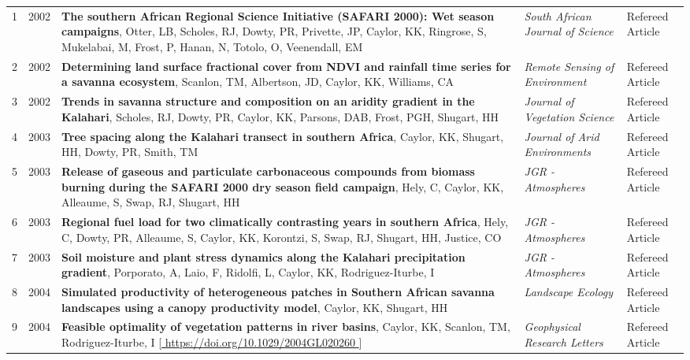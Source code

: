 
\begin{supertabular}{lcp{8.25cm}p{4.75cm}p{1.75cm}}
1 & 2002 & {\bf The southern African Regional Science Initiative (SAFARI 2000): Wet season campaigns}, Otter, LB, Scholes, RJ, Dowty, PR, Privette, JP, Caylor, KK, Ringrose, S, Mukelabai, M, Frost, P, Hanan, N, Totolo, O, Veenendall, EM  & \emph{ South African Journal of Science } & Refereed Article\\
2 & 2002 & {\bf Determining land surface fractional cover from NDVI and rainfall time series for a savanna ecosystem}, Scanlon, TM, Albertson, JD, Caylor, KK, Williams, CA  & \emph{ Remote Sensing of Environment } & Refereed Article\\
3 & 2002 & {\bf Trends in savanna structure and composition on an aridity gradient in the Kalahari}, Scholes, RJ, Dowty, PR, Caylor, KK, Parsons, DAB, Frost, PGH, Shugart, HH  & \emph{ Journal of Vegetation Science } & Refereed Article\\
4 & 2003 & {\bf Tree spacing along the Kalahari transect in southern Africa}, Caylor, KK, Shugart, HH, Dowty, PR, Smith, TM  & \emph{ Journal of Arid Environments } & Refereed Article\\
5 & 2003 & {\bf Release of gaseous and particulate carbonaceous compounds from biomass burning during the SAFARI 2000 dry season field campaign}, Hely, C, Caylor, KK, Alleaume, S, Swap, RJ, Shugart, HH  & \emph{ JGR - Atmospheres } & Refereed Article\\
6 & 2003 & {\bf Regional fuel load for two climatically contrasting years in southern Africa}, Hely, C, Dowty, PR, Alleaume, S, Caylor, KK, Korontzi, S, Swap, RJ, Shugart, HH, Justice, CO  & \emph{ JGR - Atmospheres } & Refereed Article\\
7 & 2003 & {\bf Soil moisture and plant stress dynamics along the Kalahari precipitation gradient}, Porporato, A, Laio, F, Ridolfi, L, Caylor, KK, Rodriguez-Iturbe, I  & \emph{ JGR - Atmospheres } & Refereed Article\\
8 & 2004 & {\bf Simulated productivity of heterogeneous patches in Southern African savanna landscapes using a canopy productivity model}, Caylor, KK, Shugart, HH  & \emph{ Landscape Ecology } & Refereed Article\\
9 & 2004 & {\bf Feasible optimality of vegetation patterns in river basins}, Caylor, KK, Scanlon, TM, Rodriguez-Iturbe, I [\url{ https://doi.org/10.1029/2004GL020260 }] & \emph{ Geophysical Research Letters } & Refereed Article\\

\end{supertabular}
